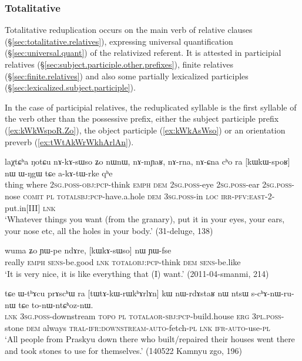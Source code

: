 \subsubsection{Totalitative} \label{sec:totalitative.redp}
Totalitative reduplication occurs on the main verb of relative clauses (§\ref{sec:totalitative.relatives}), expressing universal quantification (§\ref{sec:universal.quant}) of the relativized referent. It is attested in participial relatives (§\ref{sec:subject.participle.other.prefixes}), finite relatives (§\ref{sec:finite.relatives}) and also some partially lexicalized participles (§\ref{sec:lexicalized.subject.participle}).

In the case of participial relatives, the reduplicated syllable is the first syllable of the verb other than the possessive prefix, either the subject participle prefix  (\ref{ex:kWkWspoR.Zo}), the object participle  (\ref{ex:kWkAsWso}) or an orientation preverb (\ref{ex:tWtAkWrWkhArlAn}).

\begin{exe}
\ex \label{ex:kWkWspoR.Zo}
\gll laχtɕʰa ŋotɕu nɤ-kɤ-sɯso ʑo nɯnɯ, nɤ-mɲaʁ, nɤ-rna, nɤ-ɕna cʰo ra [kɯ\redp{}kɯ-spoʁ] nɯ ɯ-ŋgɯ tɕe a-kɤ-tɯ-rke qʰe \\
thing where \textsc{2sg}.\textsc{poss}-\textsc{obj}:\textsc{pcp}-think \textsc{emph} \textsc{dem} \textsc{2sg}.\textsc{poss}-eye \textsc{2sg}.\textsc{poss}-ear \textsc{2sg}.\textsc{poss}-nose \textsc{comit} \textsc{pl} \textsc{total}\redp{}\textsc{sbj}:\textsc{pcp}-have.a.hole \textsc{dem} \textsc{3sg}.\textsc{poss}-in \textsc{loc} \textsc{irr}-\textsc{pfv}:\textsc{east}-2-put.in[III] \textsc{lnk} \\
\glt `Whatever things you want (from the granary), put it in your eyes, your ears, your nose etc, all the holes in your body.' (31-deluge, 138)
\end{exe}

\begin{exe}
\ex \label{ex:kWkAsWso}
\gll wuma ʑo ɲɯ-pe ndɤre, [kɯ\redp{}kɤ-sɯso] nɯ ɲɯ-fse   \\
really \textsc{emph} \textsc{sens}-be.good \textsc{lnk} \textsc{total}\redp{}\textsc{obj}:\textsc{pcp}-think \textsc{dem} \textsc{sens}-be.like  \\
\glt `It is very nice, it is like everything that (I) want.' (2011-04-smanmi, 214)
\end{exe} 

\begin{exe}
\ex \label{ex:tWtAkWrWkhArlAn}
\gll  tɕe ɯ-tʰɤcu prɤscʰɯ ra [tɯ\redp{}tɤ-kɯ-rɯkʰɤrlɤn] kɯ nɯ-rdɤstaʁ nɯ ntsɯ s-cʰɤ-nɯ-ru-nɯ tɕe to-nɯ-ntɕʰoz-nɯ. \\
\textsc{lnk} \textsc{3sg}.\textsc{poss}-downstream  \textsc{topo} \textsc{pl} \textsc{total}\redp{}\textsc{aor}-\textsc{sbj}:\textsc{pcp}-build.house \textsc{erg} \textsc{3pl}.\textsc{poss}-stone \textsc{dem} always \textsc{tral}-\textsc{ifr}:\textsc{downstream}-\textsc{auto}-fetch-\textsc{pl} \textsc{lnk} \textsc{ifr}-\textsc{auto}-use-\textsc{pl} \\
\glt `All people from Praskyu down there who built/repaired their houses went there and took stones to use for themselves.' (140522 Kamnyu zgo, 196)
\end{exe}

